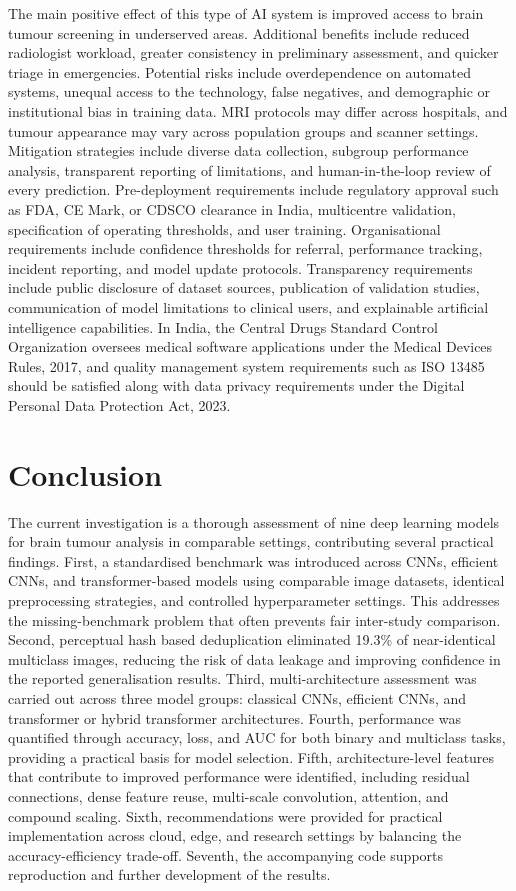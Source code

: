 \documentclass[final,3p,times,number]{elsarticle}
\begin{document}
The main positive effect of this type of AI system is improved access to brain tumour screening in underserved areas. Additional benefits include reduced radiologist workload, greater consistency in preliminary assessment, and quicker triage in emergencies. Potential risks include overdependence on automated systems, unequal access to the technology, false negatives, and demographic or institutional bias in training data. MRI protocols may differ across hospitals, and tumour appearance may vary across population groups and scanner settings. Mitigation strategies include diverse data collection, subgroup performance analysis, transparent reporting of limitations, and human-in-the-loop review of every prediction. Pre-deployment requirements include regulatory approval such as FDA, CE Mark, or CDSCO clearance in India, multicentre validation, specification of operating thresholds, and user training. Organisational requirements include confidence thresholds for referral, performance tracking, incident reporting, and model update protocols. Transparency requirements include public disclosure of dataset sources, publication of validation studies, communication of model limitations to clinical users, and explainable artificial intelligence capabilities. In India, the Central Drugs Standard Control Organization oversees medical software applications under the Medical Devices Rules, 2017, and quality management system requirements such as ISO 13485 should be satisfied along with data privacy requirements under the Digital Personal Data Protection Act, 2023.

\section{Conclusion}

The current investigation is a thorough assessment of nine deep learning models for brain tumour analysis in comparable settings, contributing several practical findings. First, a standardised benchmark was introduced across CNNs, efficient CNNs, and transformer-based models using comparable image datasets, identical preprocessing strategies, and controlled hyperparameter settings. This addresses the missing-benchmark problem that often prevents fair inter-study comparison. Second, perceptual hash based deduplication eliminated 19.3\% of near-identical multiclass images, reducing the risk of data leakage and improving confidence in the reported generalisation results. Third, multi-architecture assessment was carried out across three model groups: classical CNNs, efficient CNNs, and transformer or hybrid transformer architectures. Fourth, performance was quantified through accuracy, loss, and AUC for both binary and multiclass tasks, providing a practical basis for model selection. Fifth, architecture-level features that contribute to improved performance were identified, including residual connections, dense feature reuse, multi-scale convolution, attention, and compound scaling. Sixth, recommendations were provided for practical implementation across cloud, edge, and research settings by balancing the accuracy-efficiency trade-off. Seventh, the accompanying code supports reproduction and further development of the results.
\end{document}
